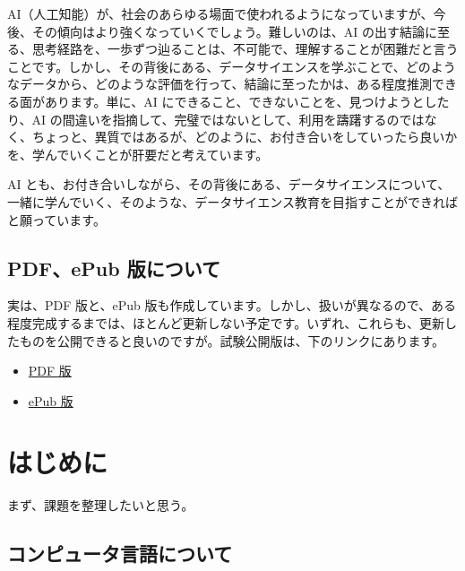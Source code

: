 \documentclass[
]{bxjsbook}
\providecommand{\tightlist}{%
  \setlength{\itemsep}{0pt}\setlength{\parskip}{0pt}}
\theoremstyle{definition}
\theoremstyle{definition}
\theoremstyle{definition}
\theoremstyle{definition}
\theoremstyle{remark}
\begin{document}
AI（人工知能）が、社会のあらゆる場面で使われるようになっていますが、今後、その傾向はより強くなっていくでしょう。難しいのは、AI の出す結論に至る、思考経路を、一歩ずつ辿ることは、不可能で、理解することが困難だと言うことです。しかし、その背後にある、データサイエンスを学ぶことで、どのようなデータから、どのような評価を行って、結論に至ったかは、ある程度推測できる面があります。単に、AI にできること、できないことを、見つけようとしたり、AI の間違いを指摘して、完璧ではないとして、利用を躊躇するのではなく、ちょっと、異質ではあるが、どのように、お付き合いをしていったら良いかを、学んでいくことが肝要だと考えています。

AI とも、お付き合いしながら、その背後にある、データサイエンスについて、一緒に学んでいく、そのような、データサイエンス教育を目指すことができればと願っています。

\hypertarget{pdfepub-ux7248ux306bux3064ux3044ux3066}{%
\subsection*{PDF、ePub 版について}\label{pdfepub-ux7248ux306bux3064ux3044ux3066}}

実は、PDF 版と、ePub 版も作成しています。しかし、扱いが異なるので、ある程度完成するまでは、ほとんど更新しない予定です。いずれ、これらも、更新したものを公開できると良いのですが。試験公開版は、下のリンクにあります。

\begin{itemize}
\tightlist
\item
  \href{https://icu-hsuzuki.github.io/ds_education/ds_education.pdf}{PDF 版}
\item
  \href{https://icu-hsuzuki.github.io/ds_education/ds_education.epub}{ePub 版}
\end{itemize}

\hypertarget{introduction}{%
\section{はじめに}\label{introduction}}

まず、課題を整理したいと思う。

\hypertarget{ux30b3ux30f3ux30d4ux30e5ux30fcux30bfux8a00ux8a9eux306bux3064ux3044ux3066}{%
\subsection*{コンピュータ言語について}\label{ux30b3ux30f3ux30d4ux30e5ux30fcux30bfux8a00ux8a9eux306bux3064ux3044ux3066}}
\end{document}
